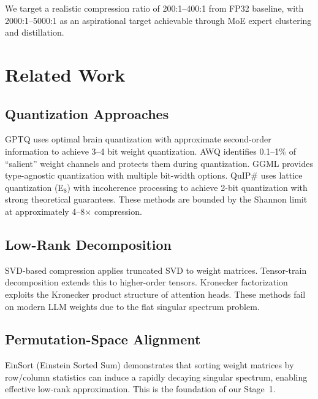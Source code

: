 \documentclass[11pt,a4paper]{article}
\begin{document}
We target a realistic compression ratio of 200:1--400:1 from FP32 baseline, with
2000:1--5000:1 as an aspirational target achievable through MoE expert clustering
and distillation.

\section{Related Work}

\subsection{Quantization Approaches}

GPTQ \cite{frantar2023gptq} uses optimal brain quantization with approximate second-order
information to achieve 3--4 bit weight quantization. AWQ \cite{lin2024awq} identifies
0.1--1\% of ``salient'' weight channels and protects them during quantization. GGML
\cite{gerganov2023ggml} provides type-agnostic quantization with multiple bit-width
options. QuIP\# \cite{tseng2024quip} uses lattice quantization (E$_8$) with incoherence
processing to achieve 2-bit quantization with strong theoretical guarantees. These
methods are bounded by the Shannon limit at approximately 4--8$\times$ compression.

\subsection{Low-Rank Decomposition}

SVD-based compression \cite{denton2014exploiting} applies truncated SVD to weight
matrices. Tensor-train decomposition \cite{oseledets2011tensor} extends this to
higher-order tensors. Kronecker factorization \cite{zhang2023kron} exploits the
Kronecker product structure of attention heads. These methods fail on modern LLM
weights due to the flat singular spectrum problem.

\subsection{Permutation-Space Alignment}

EinSort (Einstein Sorted Sum) \cite{liu2024einsort} demonstrates that sorting weight
matrices by row/column statistics can induce a rapidly decaying singular spectrum,
enabling effective low-rank approximation. This is the foundation of our Stage~1.
\end{document}
